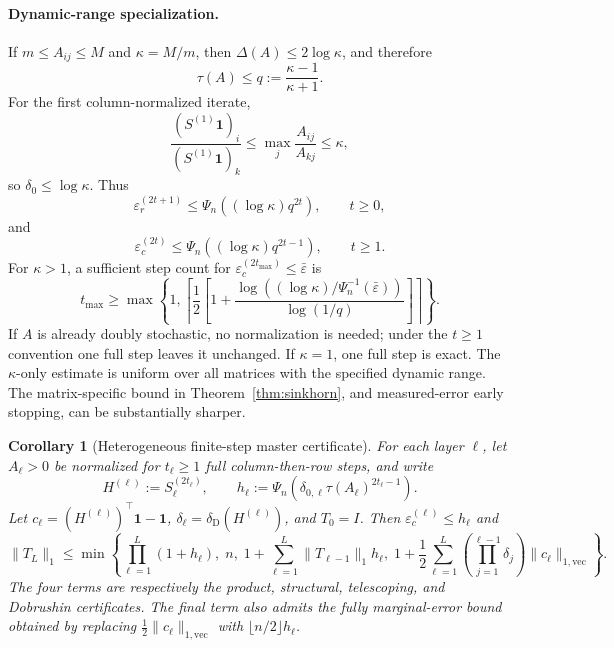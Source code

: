 \documentclass[10pt]{article}
\numberwithin{equation}{section}
\theoremstyle{plain}
\newtheorem{corollary}[theorem]{Corollary}
\theoremstyle{definition}
\theoremstyle{remark}
\newcommand{\ones}{\mathbf{1}}
\begin{document}
\paragraph{Dynamic-range specialization.}
If \(m\le A_{ij}\le M\) and \(\kappa=M/m\), then
\(\Delta(A)\le2\log\kappa\), and therefore
\[
        \tau(A)\le q:=\frac{\kappa-1}{\kappa+1}.
\]
For the first column-normalized iterate,
\[
\frac{(S^{(1)}\ones)_i}{(S^{(1)}\ones)_k}
\le \max_j\frac{A_{ij}}{A_{kj}}\le\kappa,
\]
so \(\delta_0\le\log\kappa\). Thus
\begin{equation}\label{eq:row-certificate-kappa}
\varepsilon_r^{(2t+1)}
\le
\Psi_n\!\left((\log\kappa)q^{2t}\right),\qquad t\ge0,
\end{equation}
and
\begin{equation}\label{eq:column-certificate-kappa}
\varepsilon_c^{(2t)}
\le
\Psi_n\!\left((\log\kappa)q^{2t-1}\right),\qquad t\ge1.
\end{equation}
For \(\kappa>1\), a sufficient step count for
\(\varepsilon_c^{(2t_{\max})}\le\bar\varepsilon\) is
\begin{equation}\label{eq:tmax}
t_{\max}
\ge
\max\left\{
1,
\left\lceil
\frac12\left[
1+
\frac{\log\!\left((\log\kappa)/\Psi_n^{-1}(\bar\varepsilon)\right)}
{\log(1/q)}
\right]
\right\rceil
\right\}.
\end{equation}
If \(A\) is already doubly stochastic, no normalization is needed; under the
\(t\ge1\) convention one full step leaves it unchanged. If \(\kappa=1\), one full
step is exact. The \(\kappa\)-only estimate is uniform over all matrices with the
specified dynamic range. The matrix-specific bound in Theorem~\ref{thm:sinkhorn},
and measured-error early stopping, can be substantially sharper.

\begin{corollary}[Heterogeneous finite-step master certificate]
\label{cor:master-certificate}
For each layer \(\ell\), let \(A_\ell>0\) be normalized for \(t_\ell\ge1\) full
column-then-row steps, and write
\[
H^{(\ell)}:=S_\ell^{(2t_\ell)},
\qquad
h_\ell:=\Psi_n\!\left(
\delta_{0,\ell}\tau(A_\ell)^{2t_\ell-1}
\right).
\]
Let \(c_\ell=(H^{(\ell)})^\top\ones-\ones\),
\(\delta_\ell=\delta_{\mathrm D}(H^{(\ell)})\), and \(T_0=I\). Then
\(\varepsilon_c^{(\ell)}\le h_\ell\) and
\begin{equation}\label{eq:master-certificate}
\|T_L\|_1
\le
\min\left\{
\prod_{\ell=1}^L(1+h_\ell),\;
n,\;
1+\sum_{\ell=1}^L\|T_{\ell-1}\|_1h_\ell,\;
1+\frac12\sum_{\ell=1}^L
\left(\prod_{j=1}^{\ell-1}\delta_j\right)
\|c_\ell\|_{1,\mathrm{vec}}
\right\}.
\end{equation}
The four terms are respectively the product, structural, telescoping, and
Dobrushin certificates. The final term also admits the fully marginal-error
bound obtained by replacing
\(\frac12\|c_\ell\|_{1,\mathrm{vec}}\) with
\(\lfloor n/2\rfloor h_\ell\).
\end{corollary}
\end{document}
